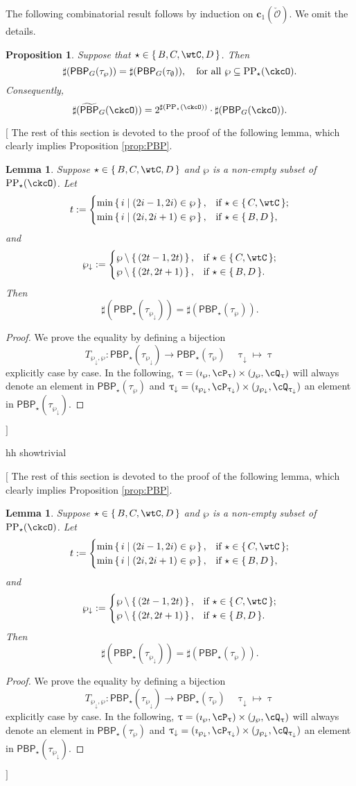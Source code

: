 \documentclass[12pt,a4paper]{amsart}
\newcommand{\trivial}[2][]{\if\relax\detokenize{#1}\relax
  {%
      \color{orange} \vspace{0em} $[$  #2 $]$
      \color{black}
  }
  \else
\ifx#1h
\ifcsname showtrivial\endcsname
{%
    \color{orange} \vspace{0em}  $[$ #2 $]$
    \color{black}
}
\fi
\else {\red Wrong argument!} \fi
\fi
}
\def\subset{\subseteq}
\newcommand{\CO}{{\mathcal {O}}}
\numberwithin{equation}{section}
\newtheorem{lem}[thm]{Lemma}
\newtheorem{prop}[thm]{Proposition}
\theoremstyle{remark}
\def\CPPs{\mathrm{PP}_{\star}}
\def\tPBP{\widetilde{\mathsf{PBP}}}
\def\PBP{\mathsf{PBP}}
\def\tPBP{\widetilde{\mathsf{PBP}}}
\begin{document}
    \smallskip

The following combinatorial result follows by induction on $\mathbf c_1(\check \CO)$. We omit the details.

\begin{prop} \label{prop:PBP2} Suppose that   $\star\in \set{B,C,\wtC,D}$. Then
  \[
    \sharp(\PBP_{G}(\tau_{\wp})) = \sharp(\PBP_{G}(\tau_{\emptyset})), \quad \textrm{for all } \wp \subset \CPPs(\ckcO).
  \]
 Consequently,
     \[
     \sharp(\tPBP_{G}(\ckcO)) = 2^{\sharp(\CPPs(\ckcO))}\cdot \sharp(\PBP_{G}(\ckcO)).
  \]
\end{prop}


\trivial[h]{
The rest of this section is devoted to the proof of the following lemma, which clearly implies Proposition \ref{prop:PBP}.



\def\PPm{\wp_{\downarrow}}
\def\uptaum{\uptau_{\downarrow}}


\begin{lem}\label{lem:down}
  Suppose $\star \in \set{B, C, \wtC, D}$ and
  $\wp$ is a non-empty subset of $\CPPs(\ckcO)$.
  Let
  \[
    t:=
    \begin{cases}
      \min\set{i|(2i-1,2i)\in \wp}, & \text{if $\star \in \set{C,\wtC}$};\\
      \min\set{i|(2i,2i+1)\in \wp}, & \text{if $\star \in \set{B,D}$},\\
    \end{cases}
  \]
  and
  \[
    \PPm:=
    \begin{cases}
      \wp \setminus \set{(2t-1,2t)},  & \text{if $\star \in \set{C,\wtC}$};\\
      \wp \setminus   \set{(2t,2t+1)}, & \text{if $\star \in \set{B,D}$}.\\
    \end{cases}
  \]
  Then
  \[
    \sharp(\PBP_{\star}(\tau_{\PPm})) = \sharp(\PBP_{\star}(\tau_{\wp})).
  \]
\end{lem}

\begin{proof}
  We prove the equality by defining a bijection
  \[
    T_{\PPm,\wp}\colon \PBP_{\star}(\tau_{\PPm}) \rightarrow \PBP_{\star}(\tau_{\wp})\quad \uptaum \mapsto \uptau
  \]
  explicitly case by case.
  In the following, $\uptau = (\imath_{\wp},\cP_{\uptau})\times (\jmath_{\wp},\cQ_{\uptau})$
  will always denote an element in $\PBP_{\star}(\tau_{\wp})$ and
  $\uptaum = (\imath_{\PPm},\cP_{\uptaum})\times (\jmath_{\PPm},\cQ_{\uptaum})$
  an element in $\PBP_{\star}(\tau_{\PPm})$.


\end{proof}}
\end{document}
